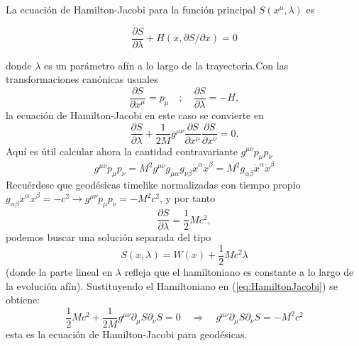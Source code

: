 La ecuación de Hamilton-Jacobi para la función principal $S\left(x^\mu, \lambda\right)$ es

\begin{equation}
    \frac{\partial S}{\partial \lambda}+H(x, \partial S / \partial x)=0
    \label{eq:HamiltonJacobi}
\end{equation}

donde $\lambda$ es un parámetro afín a lo largo de la trayectoria.Con las transformaciones canónicas usuales
\begin{equation}
    \frac{\partial S}{\partial x^\mu} = p_\mu \quad ; \quad \frac{\partial S}{\partial \lambda} = -H,
\end{equation}
la ecuación de Hamilton-Jacobi en este caso se convierte en
\begin{equation}
    \frac{\partial S}{\partial \lambda}+\frac{1}{2M} g^{\mu \nu} \frac{\partial S}{\partial x^\mu}  \frac{\partial S}{\partial x^\nu} =0.
\end{equation}
Aquí es útil calcular ahora la cantidad contravariante $g^{\mu \nu} p_\mu p_\nu$
\begin{equation}
    g^{\mu \nu} p_\mu p_\nu=M^2 g^{\mu \nu} g_{\mu \alpha} g_{\nu \beta} \dot{x}^\alpha \dot{x}^\beta=M^2 g_{\alpha \beta} \dot{x}^\alpha \dot{x}^\beta
\end{equation}
Recuérdese que geodésicas timelike normalizadas con tiempo propio $g_{\alpha \beta} \dot{x}^\alpha \dot{x}^\beta=-c^2 \rightarrow g^{\mu \nu} p_\mu p_\nu=-M^2 c^2$, y por tanto
\begin{equation}
    \frac{\partial S}{\partial \lambda}=\frac{1}{2} M c^2,
\end{equation}
podemos buscar una solución separada del tipo
\begin{equation}
    S(x, \lambda)=W(x)+\frac{1}{2} Mc^2 \lambda
\end{equation}
(donde la parte lineal en $\lambda$ refleja que el hamiltoniano es constante a lo largo de la evolución afín).
Sustituyendo el Hamiltoniano en (\ref{eq:HamiltonJacobi}) se obtiene:
\begin{equation}
    \frac{1}{2} Mc^2+\frac{1}{2 M} g^{\mu \nu} \partial_\mu S \partial_\nu S=0 \quad \Longrightarrow \quad g^{\mu \nu} \partial_\mu S \partial_\nu S=-M^2 c^2
    \label{eq:geodesicHamiltonJacobi}
\end{equation}
esta es la ecuación de Hamilton-Jacobi para geodésicas.
